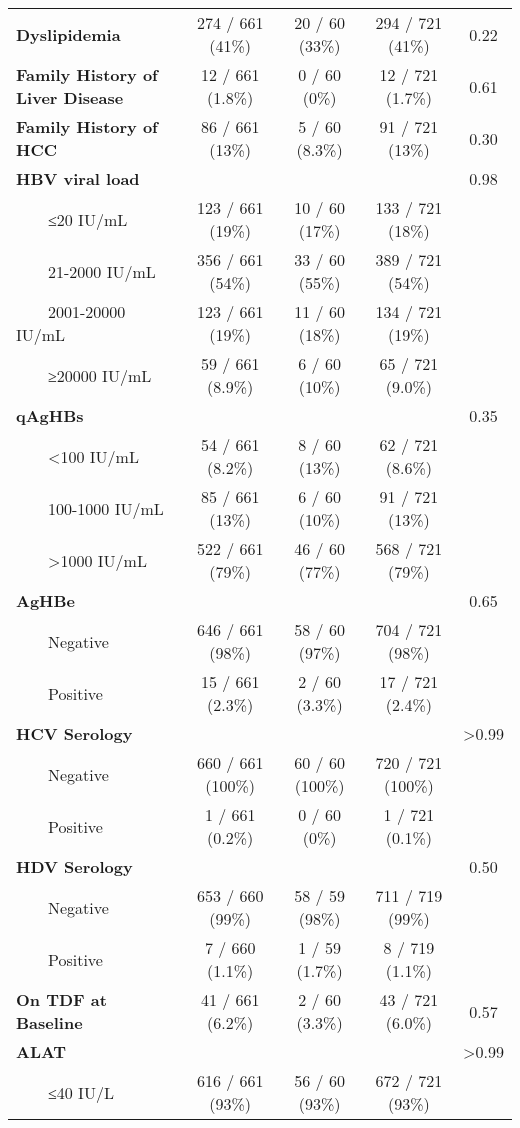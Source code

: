 \documentclass[
]{article}
\begin{document}
\begin{longtable}{lcccc}
\textbf{Dyslipidemia} & 274 / 661 (41\%) & 20 / 60 (33\%) & 294 / 721 (41\%) & 0.22 \\ 
\textbf{Family History of Liver Disease} & 12 / 661 (1.8\%) & 0 / 60 (0\%) & 12 / 721 (1.7\%) & 0.61 \\ 
\textbf{Family History of HCC} & 86 / 661 (13\%) & 5 / 60 (8.3\%) & 91 / 721 (13\%) & 0.30 \\ 
\textbf{HBV viral load} &  &  &  & 0.98 \\ 
    ≤20 IU/mL & 123 / 661 (19\%) & 10 / 60 (17\%) & 133 / 721 (18\%) &  \\ 
    21-2000 IU/mL & 356 / 661 (54\%) & 33 / 60 (55\%) & 389 / 721 (54\%) &  \\ 
    2001-20000 IU/mL & 123 / 661 (19\%) & 11 / 60 (18\%) & 134 / 721 (19\%) &  \\ 
    ≥20000 IU/mL & 59 / 661 (8.9\%) & 6 / 60 (10\%) & 65 / 721 (9.0\%) &  \\ 
\textbf{qAgHBs} &  &  &  & 0.35 \\ 
    <100 IU/mL & 54 / 661 (8.2\%) & 8 / 60 (13\%) & 62 / 721 (8.6\%) &  \\ 
    100-1000 IU/mL & 85 / 661 (13\%) & 6 / 60 (10\%) & 91 / 721 (13\%) &  \\ 
    >1000 IU/mL & 522 / 661 (79\%) & 46 / 60 (77\%) & 568 / 721 (79\%) &  \\ 
\textbf{AgHBe} &  &  &  & 0.65 \\ 
    Negative & 646 / 661 (98\%) & 58 / 60 (97\%) & 704 / 721 (98\%) &  \\ 
    Positive & 15 / 661 (2.3\%) & 2 / 60 (3.3\%) & 17 / 721 (2.4\%) &  \\ 
\textbf{HCV Serology} &  &  &  & >0.99 \\ 
    Negative & 660 / 661 (100\%) & 60 / 60 (100\%) & 720 / 721 (100\%) &  \\ 
    Positive & 1 / 661 (0.2\%) & 0 / 60 (0\%) & 1 / 721 (0.1\%) &  \\ 
\textbf{HDV Serology} &  &  &  & 0.50 \\ 
    Negative & 653 / 660 (99\%) & 58 / 59 (98\%) & 711 / 719 (99\%) &  \\ 
    Positive & 7 / 660 (1.1\%) & 1 / 59 (1.7\%) & 8 / 719 (1.1\%) &  \\ 
\textbf{On TDF at Baseline} & 41 / 661 (6.2\%) & 2 / 60 (3.3\%) & 43 / 721 (6.0\%) & 0.57 \\ 
\textbf{ALAT} &  &  &  & >0.99 \\ 
    ≤40 IU/L & 616 / 661 (93\%) & 56 / 60 (93\%) & 672 / 721 (93\%) &  \\ 

\end{longtable}
\end{document}
